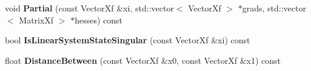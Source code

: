 \begin{DoxyCompactItemize}
\item 
void {\bfseries Partial} (const Vector\+Xf \&xi, std\+::vector$<$ Vector\+Xf $>$ $\ast$grads, std\+::vector$<$ Matrix\+Xf $>$ $\ast$hesses) const \hypertarget{classilqgames_1_1_single_player_flat_car6_d_a0b6f26a37091274148c0ff247d13a84b}{}\label{classilqgames_1_1_single_player_flat_car6_d_a0b6f26a37091274148c0ff247d13a84b}

\item 
bool {\bfseries Is\+Linear\+System\+State\+Singular} (const Vector\+Xf \&xi) const \hypertarget{classilqgames_1_1_single_player_flat_car6_d_a7e885c06c72f40ca7a2174cc61850fc3}{}\label{classilqgames_1_1_single_player_flat_car6_d_a7e885c06c72f40ca7a2174cc61850fc3}

\item 
float {\bfseries Distance\+Between} (const Vector\+Xf \&x0, const Vector\+Xf \&x1) const \hypertarget{classilqgames_1_1_single_player_flat_car6_d_afe249fbf6ebdb0449e4d11fd521c10e6}{}\label{classilqgames_1_1_single_player_flat_car6_d_afe249fbf6ebdb0449e4d11fd521c10e6}

\end{DoxyCompactItemize}
